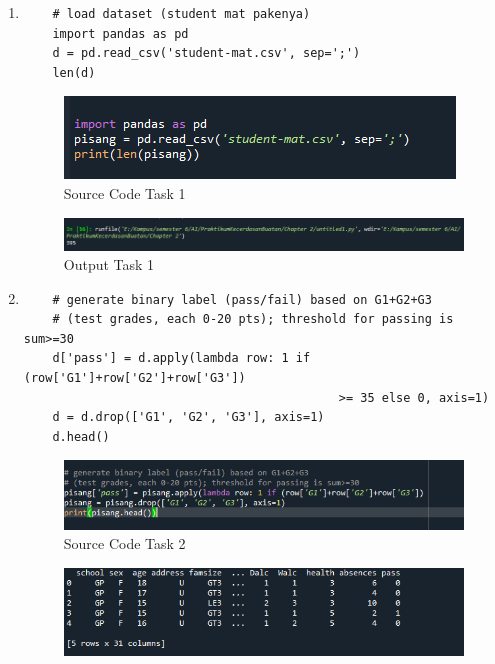\begin{enumerate}

\item
\begin{verbatim}
	# load dataset (student mat pakenya)
	import pandas as pd
	d = pd.read_csv('student-mat.csv', sep=';')
	len(d)
\end{verbatim}
\begin{figure}[h]
    \centering
    \includegraphics[scale=0.6]{figures/chapter 2/sklearn/1.png}
    \caption{Source Code Task 1}
    \label{fig:mesh1}
\end{figure}
\begin{figure}[h]
    \centering
    \includegraphics[scale=0.6]{figures/chapter 2/sklearn/2.png}
    \caption{Output Task 1}
    \label{fig:mesh1}
\end{figure}
\item
\begin{verbatim}
	# generate binary label (pass/fail) based on G1+G2+G3 
	# (test grades, each 0-20 pts); threshold for passing is sum>=30
	d['pass'] = d.apply(lambda row: 1 if (row['G1']+row['G2']+row['G3']) 
											>= 35 else 0, axis=1)
	d = d.drop(['G1', 'G2', 'G3'], axis=1)
	d.head()
\end{verbatim}
\begin{figure}[h]
    \centering
    \includegraphics[scale=0.6]{figures/chapter 2/sklearn/3.png}
    \caption{Source Code Task 2}
    \label{fig:mesh1}
\end{figure}
\begin{figure}[h]
    \centering
    \includegraphics[scale=0.6]{figures/chapter 2/sklearn/4.png}

\end{figure}
\end{enumerate}
